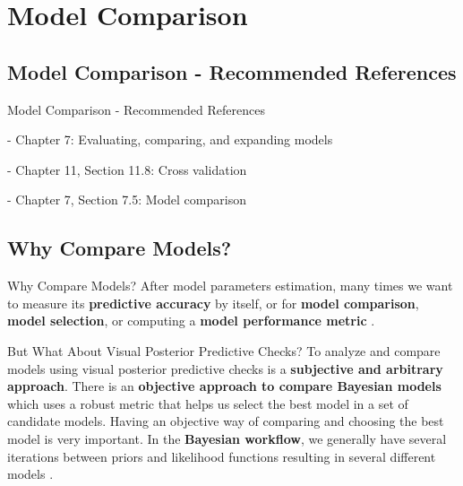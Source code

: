 \section{Model Comparison}

\subsection{Model Comparison - Recommended References}
\begin{frame}{Model Comparison - Recommended References}
	\begin{vfilleditems}
		\item \textcite{gelman2013bayesian} - Chapter 7: Evaluating, comparing, and expanding models
		\item \textcite{gelman2020regression} - Chapter 11, Section 11.8: Cross validation
		\item \textcite{mcelreath2020statistical} - Chapter 7, Section 7.5: Model comparison
		\item \textcite{vehtariPracticalBayesianModel2015}
		\item \textcite{spiegelhalter2002bayesian}
		\item \textcite{van2005dic}
		\item \textcite{watanabe2010asymptotic}
		\item \textcite{gelfand1996model}
		\item \textcite{watanabe2010asymptotic}
		\item \textcite{geisser1979predictive}
	\end{vfilleditems}
\end{frame}

\subsection{Why Compare Models?}
\begin{frame}{Why Compare Models?}
	After model parameters estimation,
	many times we want to measure its \textbf{predictive accuracy} by itself,
	or for \textbf{model comparison}, \textbf{model selection}, or computing a \textbf{model performance metric}
	\parencite{geisser1979predictive}.
\end{frame}

\begin{frame}{But What About Visual Posterior Predictive Checks?}
	To analyze and compare models using visual posterior predictive checks is a
	\textbf{subjective and arbitrary approach}.
	\vfill
	There is an \textbf{objective approach to compare Bayesian models}
	which uses a robust metric that helps us
	select the best model in a set of candidate models.
	\vfill
	Having an objective way of comparing and choosing the best model is very important.
	In the \textbf{Bayesian workflow},
	we generally have several iterations between priors and likelihood functions
	resulting in several different models \parencite{gelmanBayesianWorkflow2020}.
\end{frame}

